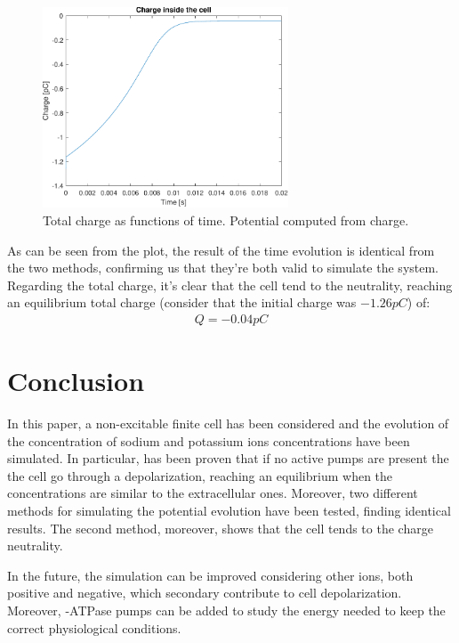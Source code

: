 \documentclass[11pt,a4 paper]{article}
\begin{document}
\begin{figure}[H]
    \centering
    \includegraphics[width=0.65\textwidth]{charge_chargepot.pdf}
    \caption{Total charge as functions of time. Potential computed from charge.}
    \label{fig:charge_chargepot}
\end{figure}

As can be seen from the plot, the result of the time evolution is identical from the two methods, confirming us that they're both valid to simulate the system. Regarding the total charge, it's clear that the cell tend to the neutrality, reaching an equilibrium total charge (consider that the initial charge was $-1.26\si{pC}$) of:
\begin{align*}
    Q = -0.04 \si{pC}
\end{align*}

\section*{Conclusion}
In this paper, a non-excitable finite cell has been considered and the evolution of the concentration of sodium and potassium ions concentrations have been simulated. In particular, has been proven that if no active pumps are present the the cell go through a depolarization, reaching an equilibrium when the concentrations are similar to the extracellular ones. Moreover, two different methods for simulating the potential evolution have been tested, finding identical results. The second method, moreover, shows that the cell tends to the charge neutrality.

In the future, the simulation can be improved considering other ions, both positive and negative, which secondary contribute to cell depolarization. Moreover, -ATPase pumps can be added to study the energy needed to keep the correct physiological conditions.
\end{document}
